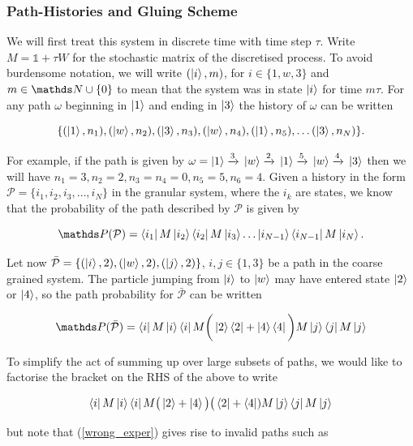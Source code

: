 \subsubsection{Path-Histories and Gluing Scheme}
\label{subsection:path-histories}

We will first treat this system in discrete time with time step $\tau$. Write $M = \mathds{1} + \tau W$ for the stochastic matrix of the discretised process. To avoid burdensome notation, we will write $(\ket{i}, m)$, for $i \in \{1, w, 3 \}$ and $m \in \bN \cup \{0\}$ to mean that the system was in state $\ket{i}$ for time $m\tau$. For any path $\omega$ beginning in $\ket{1}$ and ending in $\ket{3}$ the history of $\omega$ can be written

$$\{(\ket{1}, n_1), (\ket{w}, n_2), (\ket{3}, n_3), (\ket{w}, n_4), (\ket{1}, n_5), \ldots (\ket{3}, n_N)\}.$$

For example, if the path is given by $\omega = \ket{1}\xrightarrow{3}{} \ket{w} \xrightarrow{2}{} \ket{1} \xrightarrow{5}{} \ket{w} \xrightarrow{4}{} \ket{3}$ then we will have $n_1 = 3, n_2 =2, n_3 = n_4 = 0, n_5 = 5, n_6 = 4$.  Given a history in the form $\mathcal{P} = \{i_1, i_2, i_3, \ldots, i_N\}$ in the granular system, where the $i_k$ are states, we know that the probability of the path described by $\mathcal{P}$ is given by

$$\bP(\mathcal{P}) = \bra{i_1}M\ket{i_2}\bra{i_2}M\ket{i_3}\ldots\ket{i_{N-1}}\bra{i_{N-1}}M\ket{i_N}.$$

Let now $\bar{\mathcal{P}} = \{(\ket{i},2),(\ket{w},2),(\ket{j},2)\}$, $i,j \in \{1,3\}$ be a path in the coarse grained system. The particle jumping from $\ket{i}$ to $\ket{w}$ may have entered state $\ket{2}$ or $\ket{4}$, so the path probability for $\bar{\mathcal{P}}$ can be written

\begin{equation}
  \bP (\bar{\mathcal{P}}) = \bra{i}M\ket{i}\bra{i}M\bigg(\ket{2}\bra{2}+\ket{4}\bra{4}\bigg)M\ket{j}\bra{j}M\ket{j}
\end{equation}

To simplify the act of summing up over large subsets of paths, we would like to factorise the bracket on the RHS of the above to write

\begin{equation}\label{wrong_exper}
    \bra{i}M\ket{i}\bra{i}M\big(\ket{2}+\ket{4}\big)\big(\bra{2}+\bra{4})M\ket{j}\bra{j}M\ket{j}
\end{equation}

but note that (\ref{wrong_exper}) gives rise to invalid paths such as

